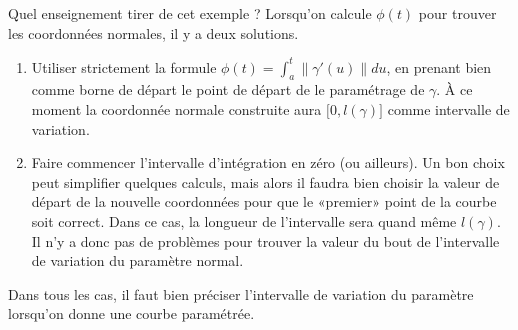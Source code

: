 Quel enseignement tirer de cet exemple ? Lorsqu'on calcule \( \phi(t)\) pour trouver les coordonnées normales, il y a deux solutions.
\begin{enumerate}
	\item
	      Utiliser strictement la formule \( \phi(t)=\int_a^t\| \gamma'(u) \|du\), en prenant bien comme borne de départ le point de départ de le paramétrage de \( \gamma\). À ce moment la coordonnée normale construite aura \( \mathopen[ 0 , l(\gamma) \mathclose]\) comme intervalle de variation.
	\item
	      Faire commencer l'intervalle d'intégration en zéro (ou ailleurs). Un bon choix peut simplifier quelques calculs, mais alors il faudra bien choisir la valeur de départ de la nouvelle coordonnées pour que le «premier» point de la courbe soit correct. Dans ce cas, la longueur de l'intervalle sera quand même \( l(\gamma)\). Il n'y a donc pas de problèmes pour trouver la valeur du bout de l'intervalle de variation du paramètre normal.
\end{enumerate}
Dans tous les cas, il faut bien préciser l'intervalle de variation du paramètre lorsqu'on donne une courbe paramétrée.
